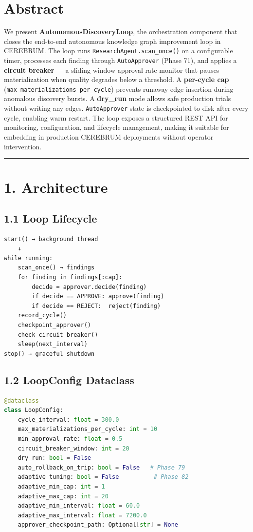 
\section*{Abstract}

We present \textbf{AutonomousDiscoveryLoop}, the orchestration component that closes the end-to-end autonomous knowledge graph improvement loop in CEREBRUM. The loop runs \texttt{ResearchAgent.scan\_once()} on a configurable timer, processes each finding through \texttt{AutoApprover} (Phase 71), and applies a \textbf{circuit breaker} --- a sliding-window approval-rate monitor that pauses materialization when quality degrades below a threshold. A \textbf{per-cycle cap} (\texttt{max\_materializations\_per\_cycle}) prevents runaway edge insertion during anomalous discovery bursts. A \textbf{dry_run} mode allows safe production trials without writing any edges. \texttt{AutoApprover} state is checkpointed to disk after every cycle, enabling warm restart. The loop exposes a structured REST API for monitoring, configuration, and lifecycle management, making it suitable for embedding in production CEREBRUM deployments without operator intervention.

\medskip\noindent\rule{\linewidth}{0.4pt}\medskip

\section*{1. Architecture}

\subsection*{1.1 Loop Lifecycle}

\begin{lstlisting}
start() → background thread
    ↓
while running:
    scan_once() → findings
    for finding in findings[:cap]:
        decide = approver.decide(finding)
        if decide == APPROVE: approve(finding)
        if decide == REJECT:  reject(finding)
    record_cycle()
    checkpoint_approver()
    check_circuit_breaker()
    sleep(next_interval)
stop() → graceful shutdown
\end{lstlisting}

\subsection*{1.2 LoopConfig Dataclass}

\begin{lstlisting}[language=Python]
@dataclass
class LoopConfig:
    cycle_interval: float = 300.0
    max_materializations_per_cycle: int = 10
    min_approval_rate: float = 0.5
    circuit_breaker_window: int = 20
    dry_run: bool = False
    auto_rollback_on_trip: bool = False   # Phase 79
    adaptive_tuning: bool = False          # Phase 82
    adaptive_min_cap: int = 1
    adaptive_max_cap: int = 20
    adaptive_min_interval: float = 60.0
    adaptive_max_interval: float = 7200.0
    approver_checkpoint_path: Optional[str] = None
\end{lstlisting}

